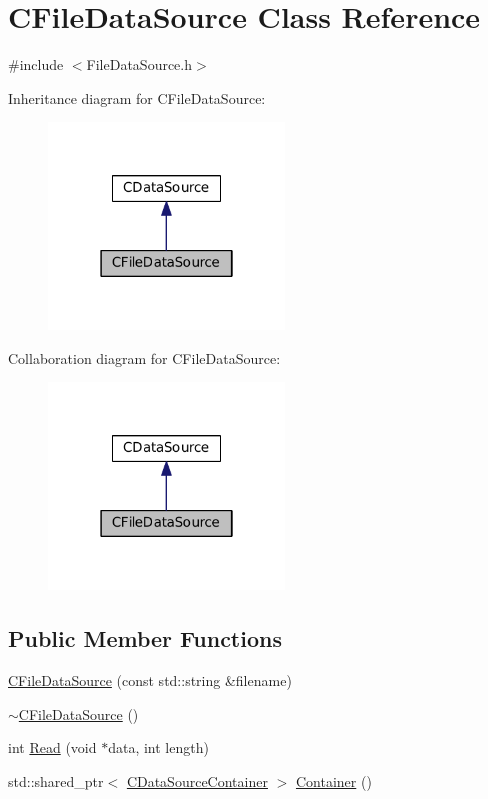 \hypertarget{classCFileDataSource}{}\section{C\+File\+Data\+Source Class Reference}
\label{classCFileDataSource}


{\ttfamily \#include $<$File\+Data\+Source.\+h$>$}



Inheritance diagram for C\+File\+Data\+Source\+:
\nopagebreak
\begin{figure}[H]
\begin{center}
\leavevmode
\includegraphics[width=178pt]{classCFileDataSource__inherit__graph}
\end{center}
\end{figure}


Collaboration diagram for C\+File\+Data\+Source\+:
\nopagebreak
\begin{figure}[H]
\begin{center}
\leavevmode
\includegraphics[width=178pt]{classCFileDataSource__coll__graph}
\end{center}
\end{figure}
\subsection*{Public Member Functions}
\begin{DoxyCompactItemize}
\item 
\hyperlink{classCFileDataSource_a785000233dad6de4fe5f5986639642b3}{C\+File\+Data\+Source} (const std\+::string \&filename)
\item 
\hyperlink{classCFileDataSource_a4f2d2cbc2a166ee6afb0c08e5c0edbd4}{$\sim$\+C\+File\+Data\+Source} ()
\item 
int \hyperlink{classCFileDataSource_a97b9c7b8904aecbe7b0e8797508265fd}{Read} (void $\ast$data, int length)
\item 
std\+::shared\+\_\+ptr$<$ \hyperlink{classCDataSourceContainer}{C\+Data\+Source\+Container} $>$ \hyperlink{classCFileDataSource_a2492b88ea8186c4cbd4bdfa92060f5fa}{Container} ()
\end{DoxyCompactItemize}
